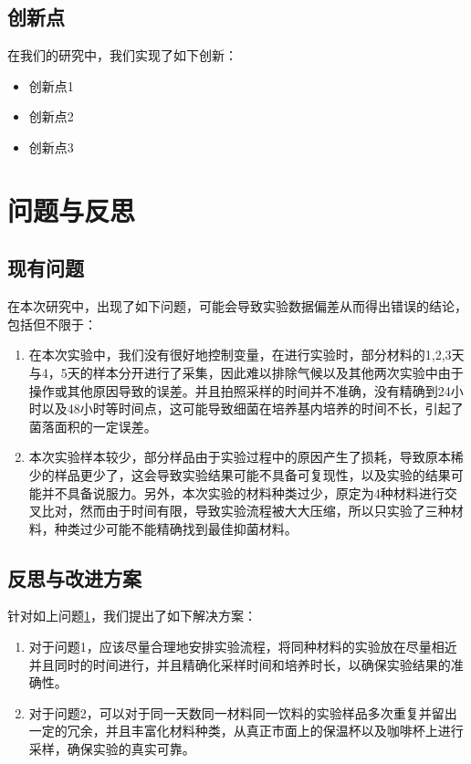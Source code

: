\documentclass[12pt,a4paper]{article}
\begin{document}
\subsection{创新点}
在我们的研究中，我们实现了如下创新：
\begin{itemize}
    \item 创新点1
    \item 创新点2
    \item 创新点3
\end{itemize}

\section{问题与反思}\label{sec:problem}
\subsection{现有问题}
在本次研究中，出现了如下问题，可能会导致实验数据偏差从而得出错误的结论，包括但不限于：
\begin{enumerate}
    \item 在本次实验中，我们没有很好地控制变量，在进行实验时，部分材料的1,2,3天与4，5天的样本分开进行了采集，因此难以排除气候以及其他两次实验中由于操作或其他原因导致的误差。并且拍照采样的时间并不准确，没有精确到24小时以及48小时等时间点，这可能导致细菌在培养基内培养的时间不长，引起了菌落面积的一定误差。
    \item 本次实验样本较少，部分样品由于实验过程中的原因产生了损耗，导致原本稀少的样品更少了，这会导致实验结果可能不具备可复现性，以及实验的结果可能并不具备说服力。另外，本次实验的材料种类过少，原定为4种材料进行交叉比对，然而由于时间有限，导致实验流程被大大压缩，所以只实验了三种材料，种类过少可能不能精确找到最佳抑菌材料。
\end{enumerate}

\subsection{反思与改进方案}
针对如上问题\ref{sec:problem}，我们提出了如下解决方案：
\begin{enumerate}
    \item 对于问题1，应该尽量合理地安排实验流程，将同种材料的实验放在尽量相近并且同时的时间进行，并且精确化采样时间和培养时长，以确保实验结果的准确性。
    \item 对于问题2，可以对于同一天数同一材料同一饮料的实验样品多次重复并留出一定的冗余，并且丰富化材料种类，从真正市面上的保温杯以及咖啡杯上进行采样，确保实验的真实可靠。
\end{enumerate}
\end{document}
